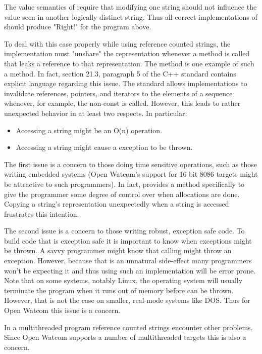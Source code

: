 The value semantics of  require that modifying one string
should not influence the value seen in another logically distinct string. Thus
all correct implementations of  should produce "Right!" for
the program above.

To deal with this case properly while using reference counted strings, the
implementation must "unshare" the representation whenever a method is called
that leaks a reference to that representation. The method  is
one example of such a method. In fact, section 21.3, paragraph 5 of the C++
standard contains explicit language regarding this issue. The standard allows
implementations to invalidate references, pointers, and iterators to the
elements of a  sequence whenever, for example, the
non-const  is called. However, this leads to rather
unexpected behavior in at least two respects. In particular:

\begin{itemize}
\item Accessing a string might be an O(n) operation.
\item Accessing a string might cause a  exception to be
thrown.
\end{itemize}

The first issue is a concern to those doing time sensitive operations, such as
those writing embedded systems (Open Watcom's support for 16 bit 8086 targets
might be attractive to such programmers). In fact,  provides
a  method specifically to give the programmer some degree of
control over when allocations are done. Copying a string's representation
unexpectedly when a string is accessed frustrates this intention.

The second issue is a concern to those writing robust, exception safe code. To
build code that is exception safe it is important to know when exceptions
might be thrown. A savvy programmer might know that calling
 might throw an exception. However, because that
is an unnatural side-effect many programmers won't be expecting it and thus
using such an implementation will be error prone. Note that on some systems,
notably Linux, the operating system will usually terminate the program when it
runs out of memory before  can be thrown. However, that
is not the case on smaller, real-mode systems like DOS. Thus for Open Watcom
this issue is a concern.

In a multithreaded program reference counted strings encounter other problems.
Since Open Watcom supports a number of multithreaded targets this is also a
concern.

